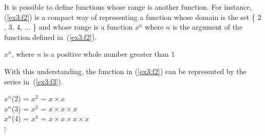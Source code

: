It is possible to define functions whose range is another function. For instance, (\ref{ex3:f2}) is a compact way of representing a function whose domain is the set \{ $2$, $3$, $4$, $\ldots$ \} and whose range is a function $x^n$ where $n$ is the argument of the function defined in~(\ref{ex3:f2}).
\begin{exe}
	\raggedright
	\ex \label{ex3:f2}%
	$x^n$, where $n$ is a positive whole number greater than 1
\end{exe}
With this understanding, the function in (\ref{ex3:f2}) can be represented by the series in~(\ref{ex3:f3}).
\begin{exe}
	\raggedright
	\ex \label{ex3:f3} 
	$x^n$(2) = $x^2$ = $x \times x$\\ $x^n$(3) = $x^3$ = $x \times x \times x$\\ $x^n$(4) = $x^4$ = $x \times x \times x \times x$\\ \hspace*{50pt}$\vdots$
\end{exe}

